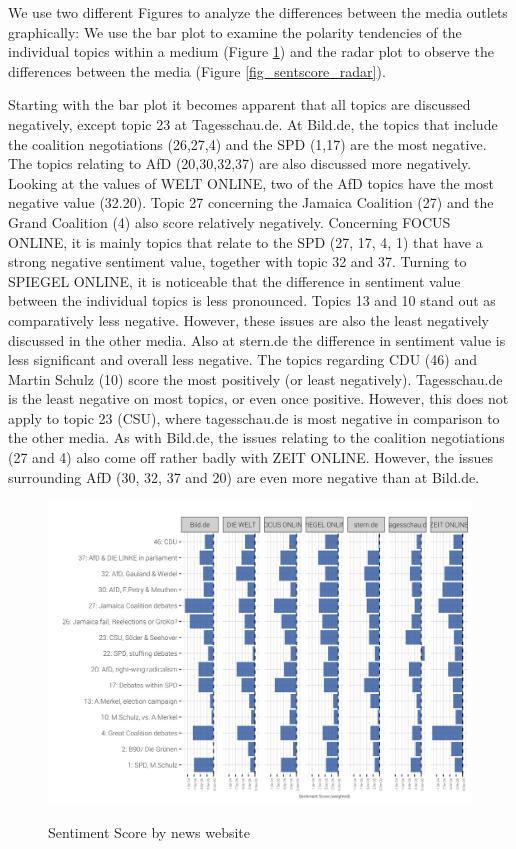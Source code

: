 \documentclass[12pt,a4paper,notitlepage]{article}
\begin{document}
We use two different Figures to analyze the differences between the media outlets graphically: We use the bar plot to examine the polarity tendencies of the individual topics within a medium (Figure \ref{fig_sentscore_site}) and the radar plot to observe the differences between the media (Figure \ref{fig_sentscore_radar}).

Starting with the bar plot it becomes apparent that all topics are discussed negatively, except topic 23 at Tagesschau.de. At Bild.de, the topics that include the coalition negotiations (26,27,4) and the SPD (1,17) are the most negative. The topics relating to AfD (20,30,32,37) are also discussed more negatively. Looking at the values of WELT ONLINE, two of the AfD topics have the most negative value (32.20). Topic 27 concerning the Jamaica Coalition (27) and the Grand Coalition (4) also score relatively negatively. Concerning FOCUS ONLINE, it is mainly topics that relate to the SPD (27, 17, 4, 1) that have a strong negative sentiment value, together with topic 32 and 37. Turning to SPIEGEL ONLINE, it is noticeable that the difference in sentiment value between the individual topics is less pronounced. Topics 13 and 10 stand out as comparatively less negative. However, these issues are also the least negatively discussed in the other media. Also at stern.de the difference in sentiment value is less significant and overall less negative. The topics regarding CDU (46) and Martin Schulz (10) score the most positively (or least negatively). Tagesschau.de is the least negative on most topics, or even once positive. However, this does not apply to topic 23 (CSU), where tagesschau.de is most negative in comparison to the other media. As with Bild.de, the issues relating to the coalition negotiations (27 and 4) also come off rather badly with ZEIT ONLINE. However, the issues surrounding AfD (30, 32, 37 and 20) are even more negative than at Bild.de. 

\begin{figure}[H]
	\caption{Sentiment Score by news website}
	\begin{center}
			\includegraphics[width=\textwidth,keepaspectratio]{../figs/sentscore_site.png}
			\label{fig_sentscore_site}
	\end{center}
\end{figure}
\end{document}
